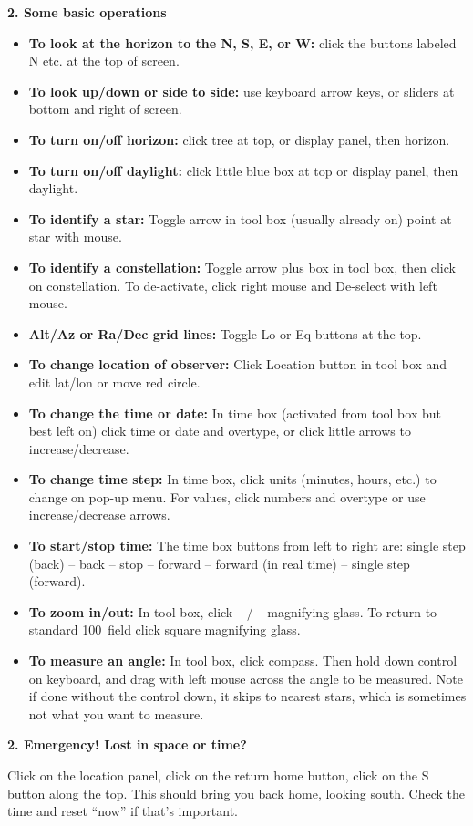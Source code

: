 \documentclass[12pt]{article}
\begin{document}
\medskip
\noindent
{\bf 2. Some basic operations}
\begin{itemize}

\item {\bf To look at the horizon to the N, S, E, or W:} click the
  buttons labeled N etc. at the top of screen.

\item {\bf To look up/down or side to side:} use keyboard arrow keys, or sliders at
  bottom and right of screen.

\item{\bf To turn on/off horizon:} click tree at top, or display panel, then horizon.

\item{\bf To turn on/off daylight:} click little blue box at top or display
  panel, then daylight.

\item{\bf To identify a star:} Toggle arrow in tool box (usually already
  on) point at star with  mouse.  

\item{\bf To identify a constellation:} Toggle arrow plus box in tool
  box, then click on constellation. To de-activate, click right mouse and
  De-select with left mouse.

\item{\bf Alt/Az or Ra/Dec grid lines:} Toggle Lo or Eq buttons at the top.

\item{\bf To change location of observer:} Click Location button in
  tool box and edit lat/lon or move red circle.

\item{\bf To change the time or date:} In time box (activated from tool
  box but best left on) click time or date and overtype, or click
  little arrows to increase/decrease.

\item{\bf To change time step:} In time box, click units (minutes,
  hours, etc.) to change on pop-up menu. For values, click numbers and overtype or use
  increase/decrease arrows. 

\item{\bf To start/stop time:} The time box buttons from left to right
  are: single step (back) -- back -- stop -- forward -- forward (in real
  time) -- single step (forward).


\item{\bf To zoom in/out:} In tool box, click +/$-$ magnifying
  glass. To return to standard 100\deg\ field click square magnifying glass.

\item{\bf To measure an angle:} In tool box, click compass. Then hold down
  control on keyboard, and  drag
  with left mouse across the angle to be measured.  Note if done
  without the control down, it skips to nearest stars, which is
  sometimes not what you want to measure.  

\end{itemize}


\medskip
\noindent
{\bf 2. Emergency! Lost in space or time?}

\smallskip
\noindent
Click on the location panel, click on the
return home button, click on the S button along the top. This should
bring you back home, looking south. Check the time and reset ``now''
if that's important.
\end{document}
